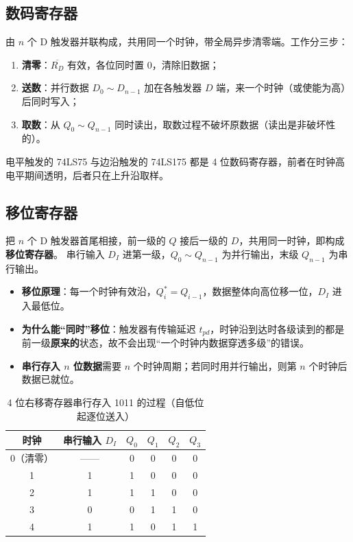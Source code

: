 \subsection{数码寄存器}
由 $n$ 个 D 触发器并联构成，共用同一个时钟，带全局异步清零端。工作分三步：
\begin{enumerate}
    \item \textbf{清零}：$\overline{R_D}$ 有效，各位同时置 0，清除旧数据；
    \item \textbf{送数}：并行数据 $D_0\sim D_{n-1}$ 加在各触发器 $D$ 端，来一个时钟（或使能为高）后同时写入；
    \item \textbf{取数}：从 $Q_0\sim Q_{n-1}$ 同时读出，取数过程不破坏原数据（读出是非破坏性的）。
\end{enumerate}
电平触发的 74LS75 与边沿触发的 74LS175 都是 4 位数码寄存器，前者在时钟高电平期间透明，后者只在上升沿取样。

\subsection{移位寄存器}
把 $n$ 个 D 触发器首尾相接，前一级的 $Q$ 接后一级的 $D$，共用同一时钟，即构成\textbf{移位寄存器}。
串行输入 $D_I$ 进第一级，$Q_0\sim Q_{n-1}$ 为并行输出，末级 $Q_{n-1}$ 为串行输出。

\begin{itemize}
    \item \textbf{移位原理}：每一个时钟有效沿，$Q_i^*=Q_{i-1}$，数据整体向高位移一位，$D_I$ 进入最低位。
    \item \textbf{为什么能“同时”移位}：触发器有传输延迟 $t_{pd}$，时钟沿到达时各级读到的都是前一级\textbf{原来的}状态，故不会出现“一个时钟内数据穿透多级”的错误。
    \item \textbf{串行存入 $n$ 位数据}需要 $n$ 个时钟周期；若同时用并行输出，则第 $n$ 个时钟后数据已就位。
\end{itemize}

\begin{table}[!htbp]
\centering
\caption{4 位右移寄存器串行存入 1011 的过程（自低位起逐位送入）}
\begin{tabular}{cc|cccc}
\toprule
时钟 & 串行输入 $D_I$ & $Q_0$ & $Q_1$ & $Q_2$ & $Q_3$ \\
\midrule
0（清零） & —— & 0 & 0 & 0 & 0 \\
1 & 1 & 1 & 0 & 0 & 0 \\
2 & 1 & 1 & 1 & 0 & 0 \\
3 & 0 & 0 & 1 & 1 & 0 \\
4 & 1 & 1 & 0 & 1 & 1 \\
\bottomrule
\end{tabular}
\end{table}

